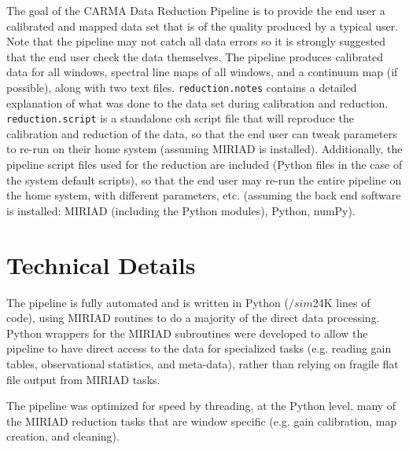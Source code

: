 The goal of the CARMA Data Reduction Pipeline is to provide the end user a calibrated and mapped data set that is of the quality produced by a typical user. Note that the pipeline may not catch all data errors so it is strongly suggested that the end user check the data themselves. The pipeline produces calibrated data for all windows, spectral line maps of all windows, and a continuum map (if possible), along with two text files. \verb#reduction.notes# contains a detailed explanation of what was done to the data set during calibration and reduction. \verb#reduction.script# is a standalone csh script file that will reproduce the calibration and reduction of the data, so that the end user can tweak parameters to re-run on their home system (assuming MIRIAD is installed). Additionally, the pipeline script files used for the reduction are included (Python files in the case of the system default scripts), so that the end user may re-run the entire pipeline on the home system, with different parameters, etc. (assuming the back end software is installed: MIRIAD (including the Python modules), Python, numPy).

\section{Technical Details}

The pipeline is fully automated and is written in Python ($/sim$24K lines of code), using MIRIAD \citep{stw95} routines to do a majority of the direct data processing. Python wrappers for the MIRIAD subroutines were developed to allow the pipeline to have direct access to the data for specialized tasks (e.g. reading gain tables, observational statistics, and meta-data), rather than relying on fragile flat file output from MIRIAD tasks.

The pipeline was optimized for speed by threading, at the Python level, many of the MIRIAD reduction tasks that are window specific (e.g. gain calibration, map creation, and cleaning).

